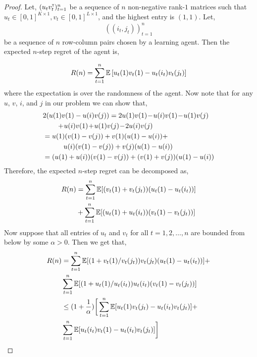 \begin{proof}
Let, $(u_t v_t^\mathsf{\scriptscriptstyle T})_{t = 1}^n$  be a sequence of $n$ non-negative rank-$1$  matrices such that $u_t \in [0, 1]^{K \times 1}, v_t \in [0, 1]^{L \times 1}$, and the highest entry is $(1, 1)$. Let,
\begin{align*}
((i_t, j_t))_{t = 1}^n
\end{align*}
be a sequence of $n$ row-column pairs chosen by a learning agent. Then the expected $n$-step regret of the agent is,


\begin{align*}
R(n) = \sum_{t = 1}^n \mathbb{E} \left[{u_t(1) v_t(1) - u_t(i_t) v_t(j_t)}\right]
\end{align*}
where the expectation is over the randomness of the agent. Now note that for any $u$, $v$, $i$, and $j$ in our problem we can show that,
\begin{align*}
& 2 (u(1) v(1) - u(i) v(j)) =  2 u(1) v(1) \! - \! u(i) v(1) \! - \! u(1) v(j)\\
&  \hspace*{2em} + \! u(i) v(1) \! + \! u(1) v(j) \! - \! 2 u(i) v(j) \\
& = u(1) (v(1) - v(j))  + v(1) (u(1) -  u(i))  +\\
& \hspace*{3em}  u(i) (v(1)  - v(j))  + v(j) (u(1)  - u(i)) \\
& = (u(1) + u(i)) (v(1) - v(j)) + (v(1) + v(j)) (u(1) - u(i))
\end{align*}
Therefore, the expected $n$-step regret can be decomposed as,
\begin{align*}
R(n) &= \sum_{t = 1}^n \mathbb{E}[{(v_t(1) + v_t(j_t)) (u_t(1) - u_t(i_t))}] \\
&+ \sum_{t = 1}^n \mathbb{E}[{(u_t(1) + u_t(i_t)) (v_t(1) - v_t(j_t))}]
\end{align*}
Now suppose that all entries of $u_t$ and $v_t$ for all $t=1,2,\ldots, n$ are bounded from below by some $\alpha > 0$. Then we get that,
\begin{align*}
R(n)
& = \sum_{t = 1}^n \mathbb{E}[{(1 + v_t(1) / v_t(j_t)) v_t(j_t) (u_t(1) - u_t(i_t))}] +\\
&\sum_{t = 1}^n \mathbb{E}[{(1 + u_t(1) / u_t(i_t)) u_t(i_t) (v_t(1) - v_t(j_t))}] \\
& \leq (1 + \frac{1}{\alpha}) \bigg[\sum_{t = 1}^n \mathbb{E}[{u_t(1) v_t(j_t) - u_t(i_t) v_t(j_t)}] + \\
& \sum_{t = 1}^n \mathbb{E}[{u_t(i_t) v_t(1) - u_t(i_t) v_t(j_t)}]\bigg]
\end{align*}


\end{proof}
